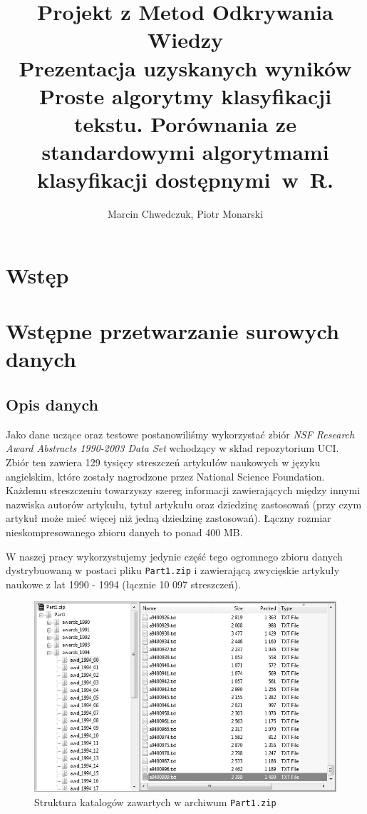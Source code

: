 \documentclass[a4paper,12pt]{article}
\title{Projekt z Metod Odkrywania Wiedzy\\Prezentacja uzyskanych wyników\\\Large{Proste algorytmy klasyfikacji tekstu. Porównania ze standardowymi algorytmami klasyfikacji dostępnymi~w~R.}\\}
\author{Marcin Chwedczuk, Piotr Monarski}
\date{}
\begin{document}
\maketitle

\section{Wstęp}

\section{Wstępne przetwarzanie surowych danych}
	\subsection{Opis danych}
		Jako dane uczące oraz testowe postanowiliśmy wykorzystać
		zbiór \textit{NSF Research Award Abstracts 1990-2003 Data Set}
		\cite{abstracts}
		wchodzący w skład repozytorium UCI.
		Zbiór ten zawiera 129 tysięcy streszczeń artykułów naukowych 
		w języku angielskim,
		które zostały nagrodzone przez National Science Foundation.
		Każdemu streszczeniu towarzyszy szereg informacji zawierających
		między innymi nazwiska autorów artykułu, tytuł artykułu oraz
		dziedzinę zastosowań (przy czym artykuł może mieć więcej 
		niż jedną dziedzinę zastosowań).
		Łączny rozmiar nieskompresowanego zbioru danych to ponad 400 MB.
		
		W naszej pracy wykorzystujemy jedynie część tego ogromnego zbioru 
		danych dystrybuowaną w postaci pliku \texttt{Part1.zip} i zawierającą
		zwycięskie artykuły naukowe z lat 1990 - 1994 (łącznie 10 097 streszczeń).
		\begin{figure}[htb]
			\centering
			\includegraphics[scale=0.45]{./img/part1_dir_struct}
			\caption{Struktura katalogów zawartych w archiwum \texttt{Part1.zip}}
		\end{figure}
		
\end{document}
